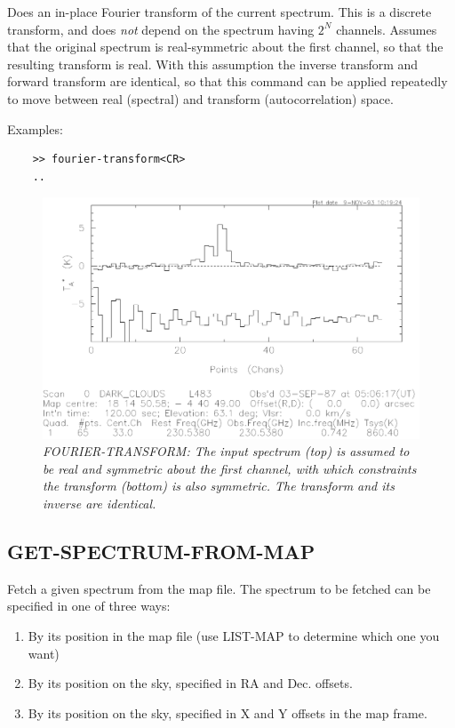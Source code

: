 \documentclass[11pt,twoside]{report}
\begin{document}
Does an in-place Fourier transform of the current spectrum. This is a
discrete transform, and does {\em not} depend on the spectrum having
$2^N$ channels. Assumes that the original spectrum is real-symmetric about
the first channel, so that the resulting transform is real. With this
assumption the inverse transform and forward transform are identical, so
that this command can be applied repeatedly to move between real (spectral)
and transform (autocorrelation) space.

Examples:
\begin{verbatim}
    >> fourier-transform<CR>
    ..
\end{verbatim}

\begin{figure}[htbp]
\begin{center}
\includegraphics[scale=0.65]{fourier}
\protect\parbox{5.5in}
{\caption[FOURIER]
{\sl
FOURIER-TRANSFORM: The input spectrum (top) is assumed to be real and
symmetric about the first channel, with which constraints the transform
(bottom) is also symmetric. The transform and its inverse are identical.
\label{FOURIER}
}
}
\end{center}
\end{figure}

\subsection{GET-SPECTRUM-FROM-MAP} 

Fetch a given spectrum from the map file. The spectrum to be fetched can
be specified in one of three ways:
\begin{enumerate}
\item By its position in the map file (use LIST-MAP to determine which one
      you want)
\item By its position on the sky, specified in RA and Dec. offsets.
\item By its position on the sky, specified in X and Y offsets in the
      map frame.
\end{enumerate}
\end{document}
